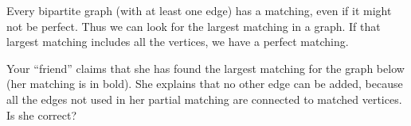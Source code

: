 \documentclass{book}
\begin{document}
\setcounter{project}{58}
\addtocounter{project}{-1}
\begin{activity}[]\label{activity-51}
\hypertarget{p-462}{}%
Every bipartite graph (with at least one edge) has a matching, even if it might not be perfect.  Thus we can look for the largest matching in a graph.  If that largest matching includes all the vertices, we have a perfect matching.%
\par
\hypertarget{p-463}{}%
Your ``friend'' claims that she has found the largest matching for the graph below (her matching is in bold). She explains that no other edge can be added, because all the edges not used in her partial matching are connected to matched vertices. Is she correct?%
\begin{sidebyside}{1}{0.3}{0.3}{0}
\begin{sbspanel}{0.4}
\end{sbspanel}
\end{sidebyside}
\end{activity}

\clearpage
\end{document}
